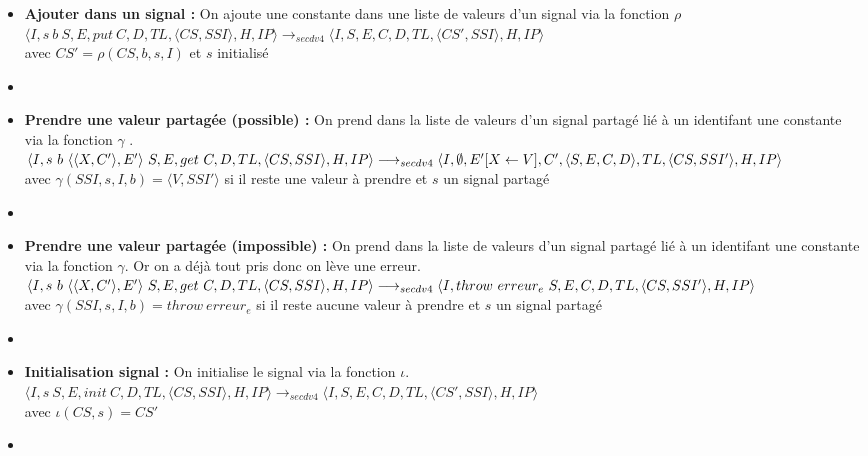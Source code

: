 \documentclass[10pt,a4paper]{article}
\begin{document}
\begin{enumerate}
\begin{itemize}
						\item[] \textbf{Ajouter dans un signal :} On ajoute une constante dans une liste de valeurs d'un signal via la fonction $\rho$
						\smallbreak
						$\langle I,s~b~S,E,put~C,D,TL,\langle CS,SSI\rangle,H,IP\rangle \longrightarrow_{secdv4} \langle I,S,E,C,D,TL,\langle CS',SSI\rangle,H,IP\rangle$ \\
						avec $CS' = \rho(CS,b,s,I)$ et $s$ initialisé
						\item[]
							
						\item[] \textbf{Prendre une valeur partagée (possible) :} On prend dans la liste de valeurs d'un signal partagé lié à un identifant une constante via la fonction $\gamma$ .
						\smallbreak
						$\langle I,s~b~\langle\langle X,C'\rangle,E'\rangle~S,E,get~C,D,TL,\langle CS,SSI\rangle,H,IP\rangle 
						\\\longrightarrow_{secdv4} \langle I,\emptyset,E'[X \leftarrow V],C',\langle S,E,C,D\rangle,TL,\langle CS,SSI'\rangle,H,IP\rangle$\\
						avec $ \gamma(SSI,s,I,b) = \langle V,SSI'\rangle$ si il reste une valeur à prendre et $s$ un signal partagé
						\item[]
							
						\item[] \textbf{Prendre une valeur partagée (impossible) :} On prend dans la liste de valeurs d'un signal partagé lié à un identifant une constante via la fonction $\gamma$. Or on a déjà tout pris donc on lève une erreur.
						\smallbreak 
						$\langle I,s~b~\langle\langle X,C'\rangle,E'\rangle~S,E,get~C,D,TL,\langle CS,SSI\rangle,H,IP\rangle 
						\\\longrightarrow_{secdv4} \langle I,throw~erreur_{e}~S,E,C,D,TL,\langle CS,SSI'\rangle,H,IP\rangle$\\
						avec $ \gamma(SSI,s,I,b) = throw~erreur_{e}$ si il reste aucune valeur à prendre et $s$ un signal partagé
						\item[]
							
						\item[] \textbf{Initialisation signal :} On initialise le signal via la fonction $\iota$.
						\smallbreak 
						$\langle I,s~S,E,init~C,D,TL,\langle CS,SSI\rangle,H,IP\rangle 
						\longrightarrow_{secdv4} \langle I,S,E,C,D,TL,\langle CS',SSI\rangle,H,IP\rangle$\\
						avec $\iota(CS,s) = CS'$
						\item[]	
							

\end{itemize}
\end{enumerate}
\end{document}
